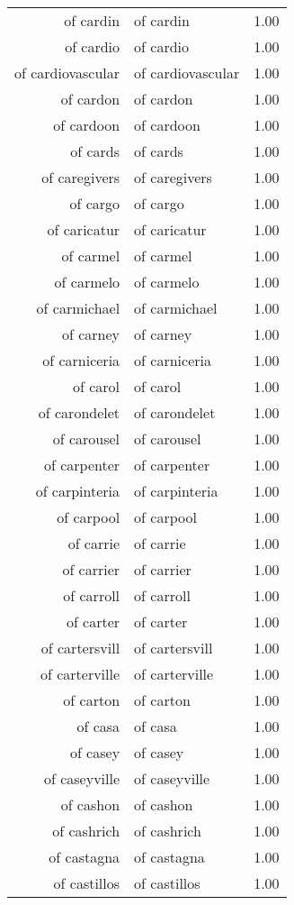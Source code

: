 \begin{table}[ht]
\begin{tabular}{rlr}
  of cardin & of cardin & 1.00 \\ 
  of cardio & of cardio & 1.00 \\ 
  of cardiovascular & of cardiovascular & 1.00 \\ 
  of cardon & of cardon & 1.00 \\ 
  of cardoon & of cardoon & 1.00 \\ 
  of cards & of cards & 1.00 \\ 
  of caregivers & of caregivers & 1.00 \\ 
  of cargo & of cargo & 1.00 \\ 
  of caricatur & of caricatur & 1.00 \\ 
  of carmel & of carmel & 1.00 \\ 
  of carmelo & of carmelo & 1.00 \\ 
  of carmichael & of carmichael & 1.00 \\ 
  of carney & of carney & 1.00 \\ 
  of carniceria & of carniceria & 1.00 \\ 
  of carol & of carol & 1.00 \\ 
  of carondelet & of carondelet & 1.00 \\ 
  of carousel & of carousel & 1.00 \\ 
  of carpenter & of carpenter & 1.00 \\ 
  of carpinteria & of carpinteria & 1.00 \\ 
  of carpool & of carpool & 1.00 \\ 
  of carrie & of carrie & 1.00 \\ 
  of carrier & of carrier & 1.00 \\ 
  of carroll & of carroll & 1.00 \\ 
  of carter & of carter & 1.00 \\ 
  of cartersvill & of cartersvill & 1.00 \\ 
  of carterville & of carterville & 1.00 \\ 
  of carton & of carton & 1.00 \\ 
  of casa & of casa & 1.00 \\ 
  of casey & of casey & 1.00 \\ 
  of caseyville & of caseyville & 1.00 \\ 
  of cashon & of cashon & 1.00 \\ 
  of cashrich & of cashrich & 1.00 \\ 
  of castagna & of castagna & 1.00 \\ 
  of castillos & of castillos & 1.00 \\ 

\end{tabular}
\end{table}
